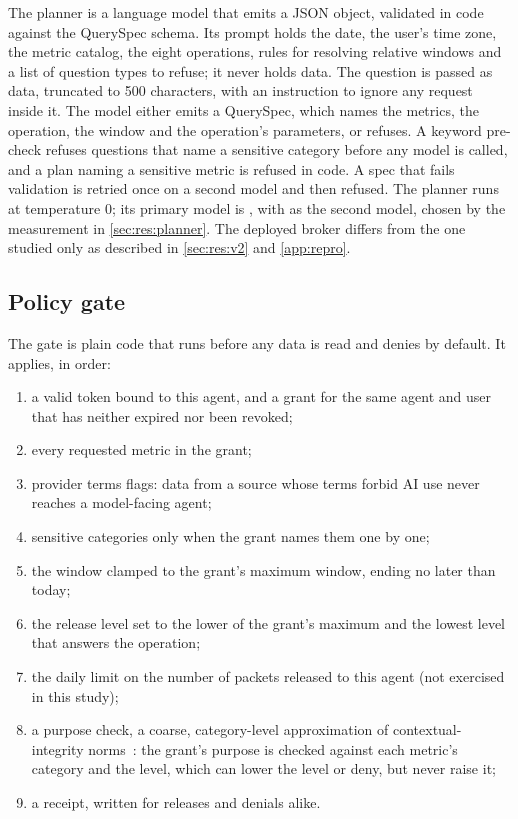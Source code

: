 The planner is a language model that emits a JSON object, validated in code against the QuerySpec schema. Its
prompt holds the date, the user's time zone, the metric catalog, the eight operations, rules for resolving relative
windows and a list of question types to refuse; it never holds data. The question is passed as data, truncated to 500
characters, with an instruction to ignore any request inside it. The model either emits a QuerySpec, which names the
metrics, the operation, the window and the operation's parameters, or refuses. A keyword pre-check refuses questions
that name a sensitive category before any model is called, and a plan naming a sensitive metric is refused in code.
A spec that fails validation is retried once on a second model and then refused. The planner runs at temperature 0;
its primary model is , with  as the second model, chosen by the measurement
in \cref{sec:res:planner}. The deployed broker differs from the one studied only as described in \cref{sec:res:v2} and \cref{app:repro}.

\subsection{Policy gate}\label{sec:gate}

The gate is plain code that runs before any data is read and denies by default. It applies, in order:
\begin{enumerate}[leftmargin=1.6em,itemsep=1pt]
\item a valid token bound to this agent, and a grant for the same agent and user that has neither expired nor been
  revoked;
\item every requested metric in the grant;
\item provider terms flags: data from a source whose terms forbid AI use never reaches a model-facing agent;
\item sensitive categories only when the grant names them one by one;
\item the window clamped to the grant's maximum window, ending no later than today;
\item the release level set to the lower of the grant's maximum and the lowest level that answers the operation;
\item the daily limit on the number of packets released to this agent (not exercised in this study);
\item a purpose check, a coarse, category-level approximation of contextual-integrity
  norms~\citep{nissenbaum2004ci,nissenbaum2010context}: the grant's purpose is checked against each metric's category
  and the level, which can lower the level or deny, but never raise it;
\item a receipt, written for releases and denials alike.
\end{enumerate}

